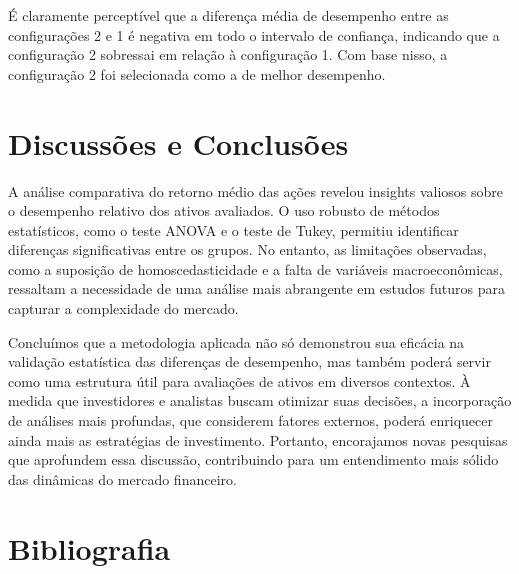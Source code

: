 \documentclass[
]{article}
\begin{document}
É claramente perceptível que a diferença média de desempenho entre as
configurações 2 e 1 é negativa em todo o intervalo de confiança,
indicando que a configuração 2 sobressai em relação à configuração 1.
Com base nisso, a configuração 2 foi selecionada como a de melhor
desempenho.

\hypertarget{discussuxf5es-e-conclusuxf5es}{%
\section{Discussões e Conclusões}\label{discussuxf5es-e-conclusuxf5es}}

A análise comparativa do retorno médio das ações revelou insights
valiosos sobre o desempenho relativo dos ativos avaliados. O uso robusto
de métodos estatísticos, como o teste ANOVA e o teste de Tukey, permitiu
identificar diferenças significativas entre os grupos. No entanto, as
limitações observadas, como a suposição de homoscedasticidade e a falta
de variáveis macroeconômicas, ressaltam a necessidade de uma análise
mais abrangente em estudos futuros para capturar a complexidade do
mercado.

Concluímos que a metodologia aplicada não só demonstrou sua eficácia na
validação estatística das diferenças de desempenho, mas também poderá
servir como uma estrutura útil para avaliações de ativos em diversos
contextos. À medida que investidores e analistas buscam otimizar suas
decisões, a incorporação de análises mais profundas, que considerem
fatores externos, poderá enriquecer ainda mais as estratégias de
investimento. Portanto, encorajamos novas pesquisas que aprofundem essa
discussão, contribuindo para um entendimento mais sólido das dinâmicas
do mercado financeiro.

\hypertarget{bibliografia}{%
\section*{Bibliografia}\label{bibliografia}}
\end{document}

